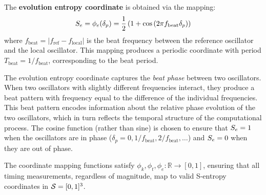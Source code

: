 \begin{definition}
\label{def:phi_e}
The \textbf{evolution entropy coordinate} is obtained via the mapping:
\begin{equation}
S_e = \phi_e(\delta_p) = \frac{1}{2}\left(1 + \cos\left( 2\pi f_{\text{beat}} \delta_p \right)\right)
\label{eq:phi_e}
\end{equation}
where $f_{\text{beat}} = |f_{\text{ref}} - f_{\text{local}}|$ is the beat frequency between the reference oscillator and the local oscillator. This mapping produces a periodic coordinate with period $T_{\text{beat}} = 1/f_{\text{beat}}$, corresponding to the beat period.
\end{definition}

The evolution entropy coordinate captures the \textit{beat phase} between two oscillators. When two oscillators with slightly different frequencies interact, they produce a beat pattern with frequency equal to the difference of the individual frequencies. This beat pattern encodes information about the relative phase evolution of the two oscillators, which in turn reflects the temporal structure of the computational process. The cosine function (rather than sine) is chosen to ensure that $S_e = 1$ when the oscillators are in phase ($\delta_p = 0, 1/f_{\text{beat}}, 2/f_{\text{beat}}, \ldots$) and $S_e = 0$ when they are out of phase.

\begin{proposition}
\label{prop:range_preservation}
The coordinate mapping functions satisfy $\phi_k, \phi_t, \phi_e: \mathbb{R} \to [0,1]$, ensuring that all timing measurements, regardless of magnitude, map to valid S-entropy coordinates in $\mathcal{S} = [0,1]^3$.
\end{proposition}

